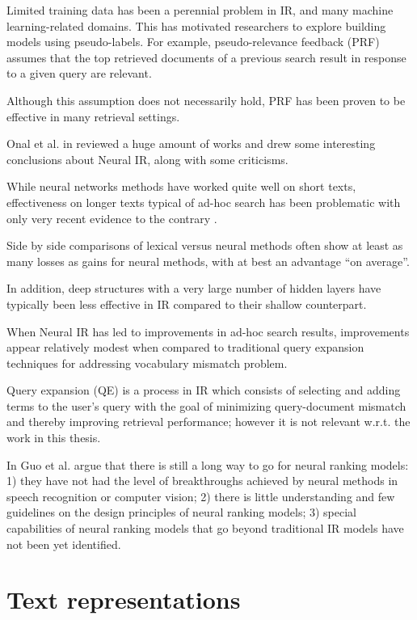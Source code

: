 Limited training data has been a perennial problem in IR, and many machine learning-related domains. This has motivated researchers to explore building models using pseudo-labels. For example, pseudo-relevance feedback (PRF) assumes that the top retrieved documents of a previous search result in response to a given query are relevant.

Although this assumption does not necessarily hold, PRF has been proven to be effective in many retrieval settings.

Onal et al. in \cite{neurIRearly} reviewed a huge amount of works and drew some interesting conclusions about Neural IR, along with some criticisms.

While neural networks methods have worked quite well on short texts, effectiveness on longer texts typical of ad-hoc search has been problematic with only very recent evidence to the contrary \cite{drmm}.
 
Side by side comparisons of lexical versus neural methods often show at least as many losses as gains for neural methods, with at best an advantage ``on average''.
 
In addition, deep structures with a very large number of hidden layers have typically been less effective in IR compared to their shallow counterpart.
 
When Neural IR has led to improvements in ad-hoc search results, improvements appear relatively modest when compared to traditional query expansion techniques for addressing vocabulary mismatch problem.

Query expansion (QE) is a process in IR which consists of selecting and adding terms to the user’s query with the goal of minimizing query-document mismatch and thereby improving retrieval performance; however it is not relevant w.r.t. the work in this thesis.

In \cite{deeplookneurir} Guo et al. argue that there is still a long way to go for neural ranking models: 1) they have not had the level of breakthroughs achieved by neural methods in speech recognition or computer vision; 2) there is little understanding and few guidelines on the design principles of neural ranking models; 3) special capabilities of neural ranking models that go beyond traditional IR models have not been yet identified.

\section{Text representations}

